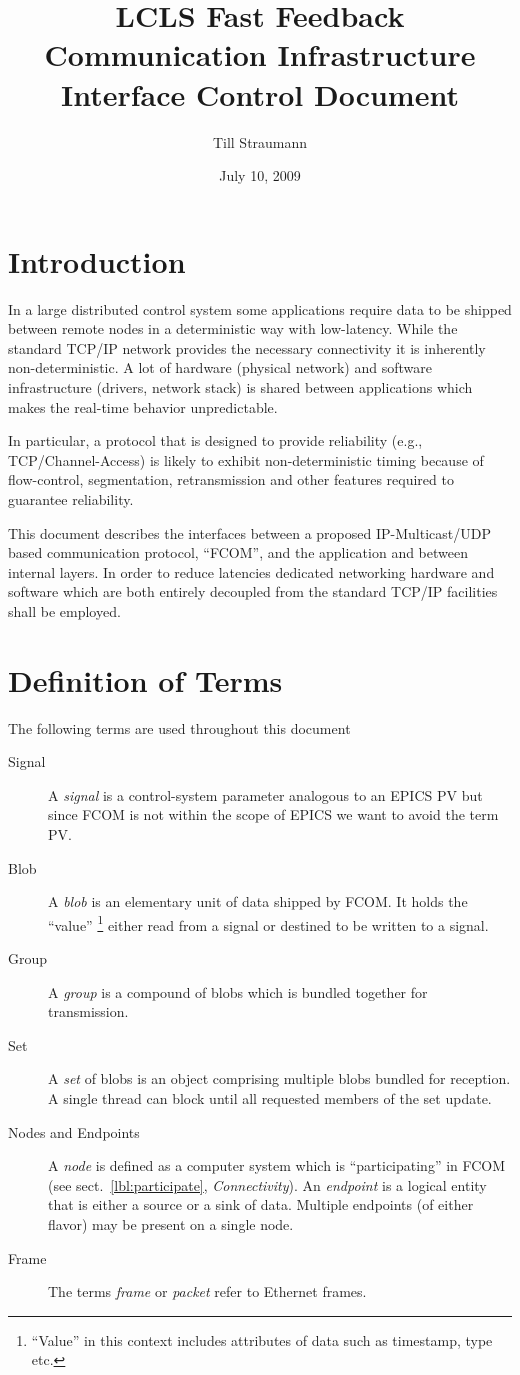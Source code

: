 \documentclass[11pt]{article}
\title{LCLS Fast Feedback Communication Infrastructure Interface Control Document}
\author{Till Straumann}
\date{July 10, 2009}
\newcommand{\fcom}{FCOM}
\newcommand{\blob}{blob}
\newcommand{\Blob}{Blob}
\newcommand{\group}{group}
\newcommand{\Group}{Group}
\newcommand{\signal}{signal}
\newcommand{\Signal}{Signal}
\newcommand{\set}{set}
\newcommand{\Set}{Set}
\begin{document}
\maketitle
\section{Introduction}
In a large distributed control system some applications
require data to be shipped between remote nodes in a
deterministic way with low-latency. While the standard
TCP/IP network provides the necessary connectivity
it is inherently non-deterministic. A lot of hardware
(physical network) and software infrastructure (drivers,
network stack) is shared between applications which makes
the real-time behavior unpredictable.

In particular, a protocol that is designed to 
provide reliability (e.g., TCP/Channel-Access) 
is likely to exhibit non-deterministic timing
because of flow-control, segmentation, retransmission
and other features required to guarantee reliability.

This document describes the interfaces between
a proposed IP-Multicast/UDP based communication protocol,
``\fcom{}'', and the application 
and between internal layers. In order to reduce latencies
dedicated networking hardware and software which are both
entirely decoupled from the standard TCP/IP facilities
shall be employed.

\section{Definition of Terms}
The following terms are used throughout this document
\begin{description}

\item[\Signal]
   A {\em \signal} is a control-system parameter analogous
   to an EPICS PV but since \fcom{} is not within the
   scope of EPICS we want to avoid the term PV.
\item[\Blob]
   A {\em \blob} is an elementary unit of data shipped
   by \fcom{}. It holds the ``value''%
\footnote{
   ``Value'' in this context includes attributes of
   data such as timestamp, type etc.
}
   either read from
   a \signal{} or destined to be written to a \signal{}.
\item[\Group]
   A {\em \group} is a compound of \blob{}s which is bundled
   together for transmission.
\item[\Set]
   A {\em \set} of \blob{}s is an object comprising multiple
   \blob{}s bundled for reception. A single thread can block
   until all requested members of the \set{} update.
\item[Nodes and Endpoints]
   A {\em node} is defined as a computer
   system which is ``participating'' in \fcom{}
   (see sect.~\ref{lbl:participate}, {\em Connectivity}).
   An {\em endpoint} is a logical entity
   that is either a source or a sink of data. Multiple
   endpoints (of either flavor) may be present on a
   single node.
\item[Frame]
   The terms {\em frame} or {\em packet} refer to
   Ethernet frames.
\end{description}
\end{document}
